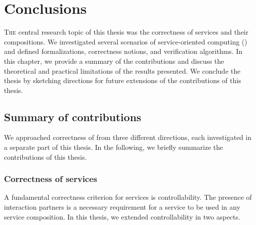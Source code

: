 \chapter{Conclusions}\label{chap:conclusion}

\lettrine[findent=.3em,lines=2,nindent=-0.4em]{T}{he} central research topic of this thesis was the correctness of services and their compositions. We investigated several scenarios of service-oriented computing () and defined formalizations, correctness notions, and verification algorithms. In this chapter, we provide a summary of the contributions and discuss the theoretical and practical limitations of the results presented. We conclude the thesis by sketching directions for future extensions of the contributions of this thesis.





\section{Summary of contributions}

We approached correctness of  from three different directions, each investigated in a separate part of this thesis. In the following, we briefly summarize the contributions of this thesis.




\subsection*{Correctness of services}

A fundamental correctness criterion for services is controllability. The presence of interaction partners is a necessary requirement for a service to be used in any service composition. In this thesis, we extended controllability in two aspects.

\enlargethispage*{\baselineskip}

